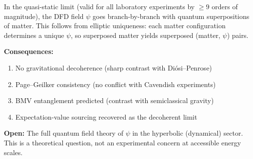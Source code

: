 \begin{tcolorbox}[colback=blue!5!white, colframe=blue!60!black, title=Branch-by-Branch Picture: Summary]
\small
In the quasi-static limit (valid for all laboratory experiments by $\geq 9$ orders of magnitude), the DFD field $\psi$ goes branch-by-branch with quantum superpositions of matter.  This follows from elliptic uniqueness: each matter configuration determines a unique $\psi$, so superposed matter yields superposed (matter, $\psi$) pairs.

\textbf{Consequences:}
\begin{enumerate}[nosep, leftmargin=*]
\item No gravitational decoherence (sharp contrast with Di\'osi--Penrose)
\item Page--Geilker consistency (no conflict with Cavendish experiments)
\item BMV entanglement predicted (contrast with semiclassical gravity)
\item Expectation-value sourcing recovered as the decoherent limit
\end{enumerate}

\textbf{Open:} The full quantum field theory of $\psi$ in the hyperbolic (dynamical) sector.  This is a theoretical question, not an experimental concern at accessible energy scales.
\end{tcolorbox}

